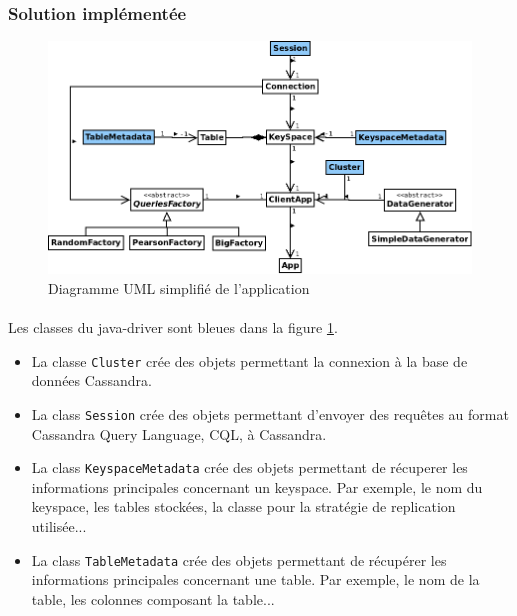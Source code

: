 \documentclass[12pt]{article}
\newcommand{\class}[1]{\texttt{#1}}
\begin{document}
\subsubsection*{Solution implémentée}


\begin{figure}[h]
	\centering
		\includegraphics[width=12cm]{images/client/diagumlclient.png}
	\caption{Diagramme UML simplifié de l'application \label{fig:client_uml}}
\end{figure}

\paragraph{} 

\paragraph{} Les classes du java-driver sont bleues dans la figure \ref{fig:client_uml}.
\begin{itemize}
 \item La classe \class{Cluster} crée des objets permettant la connexion à la base de données Cassandra.
 \item La class \class{Session} crée des objets permettant d'envoyer des requêtes au format Cassandra Query Language, CQL, à Cassandra. 
 \item La class \class{KeyspaceMetadata} crée des objets permettant de récuperer les informations principales concernant un keyspace.
 Par exemple, le nom du keyspace, les tables stockées, la classe pour la stratégie de replication utilisée...
 \item La class \class{TableMetadata} crée des objets permettant de récupérer les informations principales concernant une table.
 Par exemple, le nom de la table, les colonnes composant la table...
\end{itemize}
\end{document}
